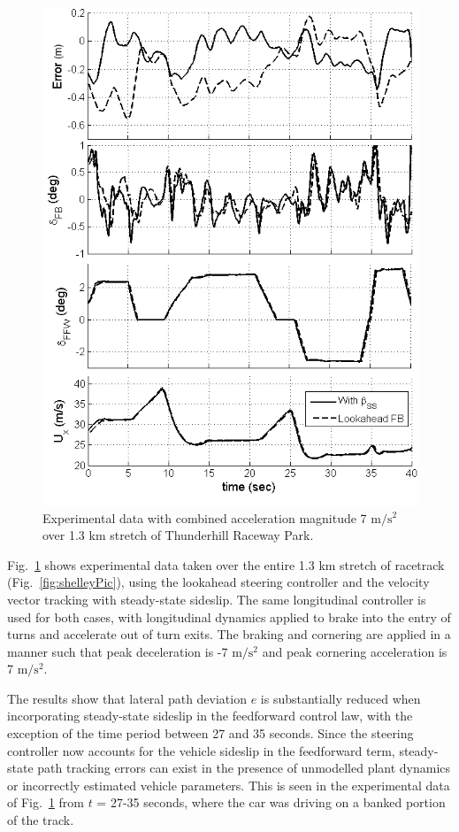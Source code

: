 \documentclass[10pt,a4paper]{article}
\begin{document}
\begin{figure}[h]
\centering
\includegraphics[width=\columnwidth]{figures/betaCompensation.png}
\caption{Experimental data with combined acceleration magnitude 7 $\mathrm{m/s^2}$ over 1.3 km stretch of Thunderhill Raceway Park.}
\label{fig:betaComparison}
\end{figure}

Fig.~\ref{fig:betaComparison} shows experimental data taken over the entire 1.3 km stretch of racetrack (Fig.~\ref{fig:shelleyPic}), using the lookahead steering controller and the
velocity vector tracking with steady-state sideslip. The same longitudinal controller is used for both cases, with 
 longitudinal dynamics applied to brake into the entry of turns and accelerate out of turn exits. The braking and cornering are applied in a
 manner such that peak deceleration is -7 $\mathrm{m/s^2}$ and peak cornering acceleration is 7 $\mathrm{m/s^2}$.

The results show that lateral path deviation $e$ is substantially reduced when incorporating steady-state sideslip in the feedforward control law, with the exception of the 
time period between 27 and 35 seconds. Since the steering controller now accounts for the vehicle sideslip in the feedforward term, steady-state path tracking errors can exist in the presence of unmodelled plant dynamics or
 incorrectly estimated vehicle parameters. This is seen in the experimental data of Fig.~\ref{fig:betaComparison} from $t$ = 27-35 seconds, where the car was driving on a banked portion of the track.  
\end{document}
